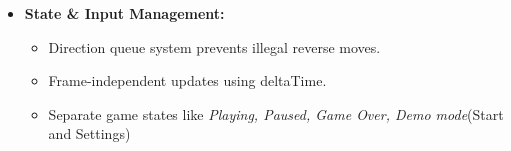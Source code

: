 \begin{itemize}
\begin{itemize}
\item Smooth snake movement using interpolation.
\item Dynamic difficulty scaling (e.g., speed increase in Hell Mode).
\item \textbf{Visual Polish: }
\begin{itemize} 
\item Pulsing food animations
\item Glow effects using canvas shadows
\item Animated snake body gradient
\item Direction-aware eyes
\item Screen shake effect on death.
\end{itemize}
\end{itemize}
     \item \textbf{State & Input Management:}
	\begin{itemize}
    \item Direction queue system prevents illegal reverse moves.
\item Frame-independent updates using deltaTime.
\item Separate game states like \textit{Playing, Paused, Game Over, Demo mode}(Start and Settings)
	

\end{itemize}
\end{itemize}
